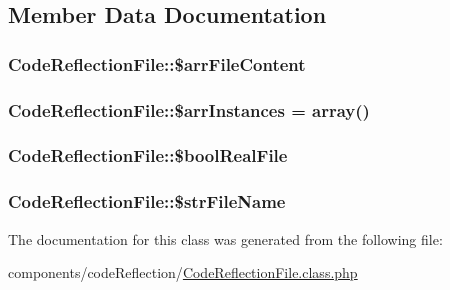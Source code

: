 \subsection{Member Data Documentation}
\hypertarget{class_code_reflection_file_ce8c257c3c8d9148294d0b6f3493c2ba}{
\subsubsection[{\$arrFileContent}]{\setlength{\rightskip}{0pt plus 5cm}CodeReflectionFile::\$arrFileContent}}
\label{class_code_reflection_file_ce8c257c3c8d9148294d0b6f3493c2ba}


\hypertarget{class_code_reflection_file_019a4ce9092e6ea5f4e51e131e3a0352}{
\subsubsection[{\$arrInstances}]{\setlength{\rightskip}{0pt plus 5cm}CodeReflectionFile::\$arrInstances = array()}}
\label{class_code_reflection_file_019a4ce9092e6ea5f4e51e131e3a0352}


\hypertarget{class_code_reflection_file_9e00721eed14d115918aaba925005394}{
\subsubsection[{\$boolRealFile}]{\setlength{\rightskip}{0pt plus 5cm}CodeReflectionFile::\$boolRealFile}}
\label{class_code_reflection_file_9e00721eed14d115918aaba925005394}


\hypertarget{class_code_reflection_file_47606edf90d11273c6b4a4b319bc42c7}{
\subsubsection[{\$strFileName}]{\setlength{\rightskip}{0pt plus 5cm}CodeReflectionFile::\$strFileName}}
\label{class_code_reflection_file_47606edf90d11273c6b4a4b319bc42c7}




The documentation for this class was generated from the following file:\begin{CompactItemize}
\item 
components/codeReflection/\hyperlink{_code_reflection_file_8class_8php}{CodeReflectionFile.class.php}\end{CompactItemize}
